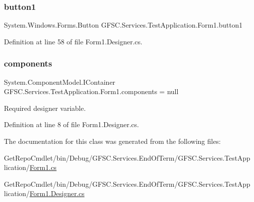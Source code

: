 \subsubsection{\texorpdfstring{button1}{button1}}
{\footnotesize\ttfamily System.\+Windows.\+Forms.\+Button G\+F\+S\+C.\+Services.\+Test\+Application.\+Form1.\+button1\hspace{0.3cm}{\ttfamily [private]}}



Definition at line 58 of file Form1.\+Designer.\+cs.

\mbox{\label{class_g_f_s_c_1_1_services_1_1_test_application_1_1_form1_ad0e40b009844f6e3a3260a89afcb3ca3}} 
\subsubsection{\texorpdfstring{components}{components}}
{\footnotesize\ttfamily System.\+Component\+Model.\+I\+Container G\+F\+S\+C.\+Services.\+Test\+Application.\+Form1.\+components = null\hspace{0.3cm}{\ttfamily [private]}}



Required designer variable. 



Definition at line 8 of file Form1.\+Designer.\+cs.



The documentation for this class was generated from the following files\+:\begin{DoxyCompactItemize}
\item 
Get\+Repo\+Cmdlet/bin/\+Debug/\+G\+F\+S\+C.\+Services.\+End\+Of\+Term/\+G\+F\+S\+C.\+Services.\+Test\+Application/\mbox{\hyperlink{_form1_8cs}{Form1.\+cs}}\item 
Get\+Repo\+Cmdlet/bin/\+Debug/\+G\+F\+S\+C.\+Services.\+End\+Of\+Term/\+G\+F\+S\+C.\+Services.\+Test\+Application/\mbox{\hyperlink{_form1_8_designer_8cs}{Form1.\+Designer.\+cs}}\end{DoxyCompactItemize}
